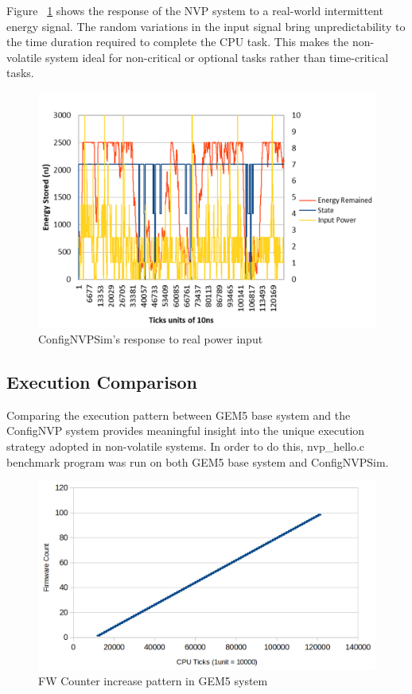 \documentclass[conference]{IEEEtran}
\begin{document}
Figure ~\ref{fig:real} shows the response of the NVP system to a real-world intermittent energy signal. The random variations in the input signal bring unpredictability to the time duration required to complete the CPU task. This makes the non-volatile system ideal for non-critical or optional tasks rather than time-critical tasks.

\begin{figure}[htbp]
\centerline{\includegraphics[scale=0.3]{orig3.png}}
\caption{ConfigNVPSim's response to real power input}
\label{fig:real}
\end{figure}

\subsection{Execution Comparison}
Comparing the execution pattern between GEM5 base system and the ConfigNVP system provides meaningful insight into the unique execution strategy adopted in non-volatile systems. In order to do this, nvp\_hello.c benchmark program was run on both GEM5 base system and ConfigNVPSim. 

\begin{figure}[htbp]
\centerline{\includegraphics[scale=0.2]{gem5_fw_count.png}}
\caption{FW Counter increase pattern in GEM5 system}
\label{fig:gem5_fw_count}
\end{figure}
\end{document}
